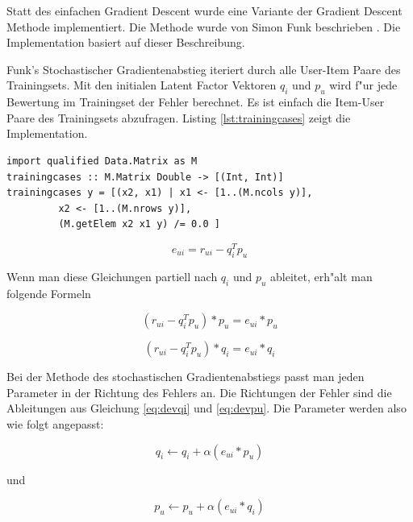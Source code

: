 \documentclass[a4paper, 12pt]{article}
\begin{document}
Statt des einfachen Gradient Descent wurde eine Variante der Gradient Descent Methode implementiert. Die Methode wurde von Simon Funk beschrieben \cite{funk}. Die Implementation basiert auf dieser Beschreibung.

Funk's Stochastischer Gradientenabstieg iteriert durch alle User-Item Paare des Trainingsets. Mit den initialen Latent Factor Vektoren $q_i$ und $p_u$ wird f"ur jede Bewertung im Trainingset der Fehler berechnet. Es ist einfach die Item-User Paare des Trainingsets abzufragen. Listing \ref{lst:trainingcases} zeigt die Implementation.

\begin{lstlisting}[caption=Abfrage des Trainingsets,label=lst:trainingcases]
import qualified Data.Matrix as M  
trainingcases :: M.Matrix Double -> [(Int, Int)]
trainingcases y = [(x2, x1) | x1 <- [1..(M.ncols y)], 
         x2 <- [1..(M.nrows y)],
         (M.getElem x2 x1 y) /= 0.0 ]
\end{lstlisting}

\begin{equation}
  \label{eq:error1}
  e_{ui} = r_{ui} - q_i^T p_u
\end{equation}

Wenn man diese Gleichungen partiell nach $q_i$ und $p_u$ ableitet, erh"alt man folgende Formeln

\begin{equation}
  \label{eq:devqi}
  (r_{ui} - q_i^T p_u) * p_u =  e_{ui} * p_u
\end{equation}

\begin{equation}
  \label{eq:devpu}
    (r_{ui} - q_i^T p_u) * q_i =  e_{ui} * q_i
\end{equation}

Bei der Methode des stochastischen Gradientenabstiegs passt man jeden Parameter in der Richtung des Fehlers an. Die Richtungen der Fehler sind die Ableitungen aus Gleichung \ref{eq:devqi} und \ref{eq:devpu}. Die Parameter werden also wie folgt angepasst:

\begin{equation}
  \label{eq:assignpi}
 q_i \leftarrow q_i + \alpha (e_{ui} * p_u)
\end{equation}

und

\begin{equation}
  \label{eq:assignqu}
 p_u \leftarrow p_u + \alpha (e_{ui} * q_i)
\end{equation}
\end{document}
